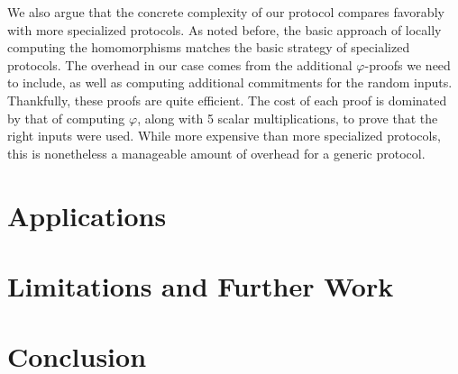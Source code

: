 We also argue that the concrete complexity of our protocol
compares favorably with more specialized protocols.
As noted before, the basic approach of locally computing
the homomorphisms matches the basic strategy of specialized protocols.
The overhead in our case comes from the additional $\varphi$-proofs
we need to include, as well as computing additional commitments
for the random inputs.
Thankfully, these proofs are quite efficient.
The cost of each proof is dominated by that of computing
$\varphi$, along with 5 scalar multiplications, to prove that
the right inputs were used.
While more expensive than more specialized protocols,
this is nonetheless a manageable amount of overhead for
a generic protocol.

\section{Applications}
\label{sec:applications}


\section{Limitations and Further Work}




\section{Conclusion}



\small 

